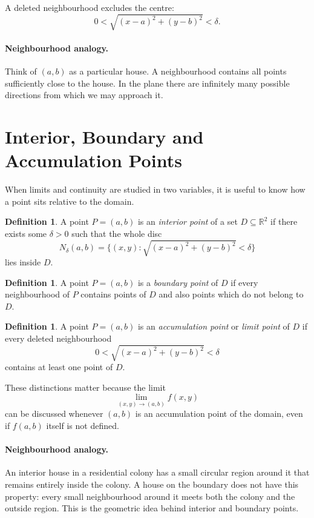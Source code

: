 \documentclass[11pt,oneside]{book}
\theoremstyle{studentthm}
\theoremstyle{definition}
\newtheorem{definition}[theorem]{Definition}
\newcommand{\R}{\mathbb{R}}
\begin{document}
A deleted neighbourhood excludes the centre:
\[
0<
\sqrt{(x-a)^2+(y-b)^2}
<\delta.
\]

\paragraph{Neighbourhood analogy.}
Think of \((a,b)\) as a particular house. A neighbourhood contains
all points sufficiently close to the house. In the plane there are
infinitely many possible directions from which we may approach it.


\section{Interior, Boundary and Accumulation Points}

When limits and continuity are studied in two variables, it is useful to
know how a point sits relative to the domain.

\begin{definition}
A point \(P=(a,b)\) is an \emph{interior point} of a set \(D\subseteq\R^2\)
if there exists some \(\delta>0\) such that the whole disc
\[
N_\delta(a,b)
=
\{(x,y):\sqrt{(x-a)^2+(y-b)^2}<\delta\}
\]
lies inside \(D\).
\end{definition}

\begin{definition}
A point \(P=(a,b)\) is a \emph{boundary point} of \(D\) if every
neighbourhood of \(P\) contains points of \(D\) and also points which do
not belong to \(D\).
\end{definition}

\begin{definition}
A point \(P=(a,b)\) is an \emph{accumulation point} or \emph{limit point}
of \(D\) if every deleted neighbourhood
\[
0<\sqrt{(x-a)^2+(y-b)^2}<\delta
\]
contains at least one point of \(D\).
\end{definition}

These distinctions matter because the limit
\[
\lim_{(x,y)\to(a,b)}f(x,y)
\]
can be discussed whenever \((a,b)\) is an accumulation point of the
domain, even if \(f(a,b)\) itself is not defined.

\paragraph{Neighbourhood analogy.}
An interior house in a residential colony has a small circular region
around it that remains entirely inside the colony. A house on the
boundary does not have this property: every small neighbourhood around
it meets both the colony and the outside region. This is the geometric
idea behind interior and boundary points.
\end{document}
